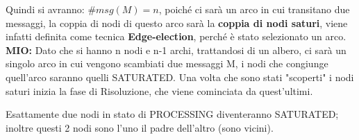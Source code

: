 Quindi si avranno: $\#msg(M) = n$, poiché ci sarà un arco in cui transitano due
messaggi, la coppia di nodi di questo arco sarà la \textbf{coppia di nodi
    saturi}, viene infatti definita come tecnica \textbf{Edge-election}, perché è
stato selezionato un arco.\\
\textbf{MIO:} Dato che si hanno n nodi e n-1 archi, trattandosi di un albero, ci
sarà un singolo arco in cui vengono scambiati due messaggi M, i nodi che
congiunge quell'arco saranno quelli SATURATED. Una volta che sono stati
"scoperti" i nodi saturi inizia la fase di Risoluzione, che viene cominciata da
quest'ultimi.

\begin{theorem}
    Esattamente due nodi in stato di PROCESSING diventeranno SATURATED;
    inoltre questi 2 nodi sono l'uno il padre dell'altro (sono vicini).
\end{theorem}


